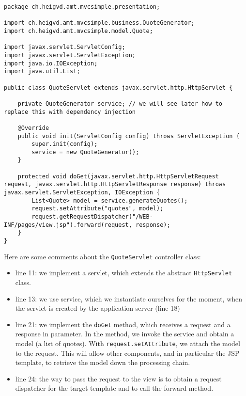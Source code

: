\vspace{10pt}
\begin{minipage}{\linewidth}
\begin{lstlisting}[frame=single]
package ch.heigvd.amt.mvcsimple.presentation;

import ch.heigvd.amt.mvcsimple.business.QuoteGenerator;
import ch.heigvd.amt.mvcsimple.model.Quote;

import javax.servlet.ServletConfig;
import javax.servlet.ServletException;
import java.io.IOException;
import java.util.List;

public class QuoteServlet extends javax.servlet.http.HttpServlet {

    private QuoteGenerator service; // we will see later how to replace this with dependency injection

    @Override
    public void init(ServletConfig config) throws ServletException {
        super.init(config);
        service = new QuoteGenerator();
    }

    protected void doGet(javax.servlet.http.HttpServletRequest request, javax.servlet.http.HttpServletResponse response) throws javax.servlet.ServletException, IOException {
        List<Quote> model = service.generateQuotes();
        request.setAttribute("quotes", model);
        request.getRequestDispatcher("/WEB-INF/pages/view.jsp").forward(request, response);
    }
}
\end{lstlisting}
\end{minipage}

Here are some comments about the \texttt{QuoteServlet} controller class:

\begin{itemize}
\item line 11: we implement a servlet, which extends the abstract \texttt{HttpServlet} class.
\item line 13: we use service, which we instantiate ourselves for the moment, when the servlet is created by the application server (line 18)
\item line 21: we implement the \texttt{doGet} method, which receives a request and a response in parameter. In the method, we invoke the service and obtain a model (a list of quotes). With \texttt{request.setAttribute}, we attach the model to the request. This will allow other components, and in particular the \ac{JSP} template, to retrieve the model down the processing chain.
\item line 24: the way to pass the request to the view is to obtain a request dispatcher for the target template and to call the forward method.
\end{itemize}

